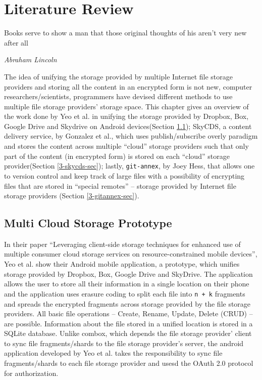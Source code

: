 \chapter{Literature Review}

\epigraph{Books serve to show a man that those original thoughts of
  his aren't very new after all}{\textit{Abraham Lincoln}}

The idea of unifying the storage provided by multiple Internet file
storage providers and storing all the content in an encrypted form is
not new, computer researchers/scientists, programmers have devised
different methods to use multiple file storage providers' storage
space. This chapter gives an overview of the work done by Yeo et
al. in unifying the storage provided by Dropbox, Box, Google Drive and
Skydrive on Android devices\cite{yeo}(Section \ref{3-yeo-sec});
SkyCDS, a content delivery service, by Gonzalez et al., which uses
publish/subscribe overly paradigm and stores the content across
multiple ``cloud'' storage providers such that only part of the
content (in encrypted form) is stored on each ``cloud'' storage
provider\cite{skycds}(Section \ref{3-skycds-sec}); lastly,
\verb+git-annex+, by Joey Hess\cite{person:joeyh}, that allows one to
version control and keep track of large files with a possibility of
encrypting files that are stored in ``special remotes'' -- storage
provided by Internet file storage providers (Section
\ref{3-gitannex-sec}).

\section{Multi Cloud Storage Prototype}\label{3-yeo-sec}

In their paper ``Leveraging client-side storage techniques for
enhanced use of multiple consumer cloud storage services on
resource-constrained mobile devices'', Yeo et al. show their Android
mobile application, a prototype, which unifies storage provided by
Dropbox, Box, Google Drive and SkyDrive. The application allows the
user to store all their information in a single location on their
phone and the application uses erasure coding\cite{weatherspoon} to
split each file into \verb`n + k` fragments and spreads the encrypted
fragments across storage provided by the file storage providers. All
basic file operations -- Create, Rename, Update, Delete (CRUD) -- are
possible. Information about the file stored in a unified location is
stored in a SQLite database. Unlike combox, which depends the file
storage provider' client to sync file fragments/shards to the file
storage provider's server, the android application developed by Yeo et
al. takes the responsibility to sync file fragments/shards to each
file storage provider and usesd the OAuth 2.0\cite{protocal:oauth2}
protocol for authorization.

